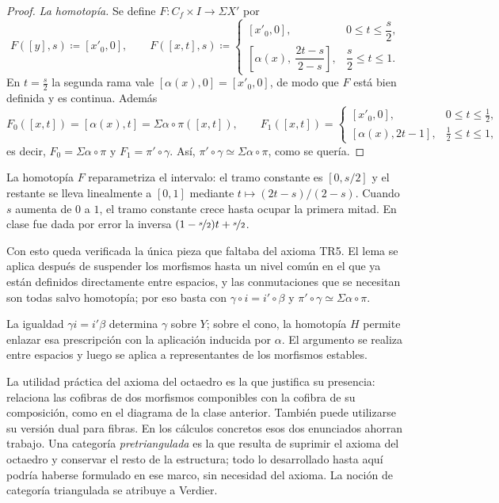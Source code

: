 \begin{proof}
\emph{La homotopía.} Se define $F\colon C_f\times I\to\Sigma X'$ por
\[
F([y],s)\coloneqq[x'_0,0],
\qquad
F([x,t],s)\coloneqq
\begin{cases}
[x'_0,0], & 0\le t\le\dfrac{s}{2},\\[6pt]
\left[\alpha(x),\ \dfrac{2t-s}{2-s}\right], & \dfrac{s}{2}\le t\le1 .
\end{cases}
\]
En $t=\tfrac s2$ la segunda rama vale $[\alpha(x),0]=[x'_0,0]$, de modo que $F$ está bien definida y es continua. Además
\[
F_0([x,t])=[\alpha(x),t]=\Sigma\alpha\circ\pi([x,t]),
\qquad
F_1([x,t])=
\begin{cases}
[x'_0,0], & 0\le t\le\tfrac12,\\[4pt]
[\alpha(x),2t-1], & \tfrac12\le t\le1,
\end{cases}
\]
es decir, $F_0=\Sigma\alpha\circ\pi$ y $F_1=\pi'\circ\gamma$. Así, $\pi'\circ\gamma\simeq\Sigma\alpha\circ\pi$, como se quería.
\end{proof}

\begin{nota}
   La homotopía $F$ reparametriza el intervalo: el tramo constante es $[0,s/2]$ y el restante se lleva linealmente a $[0,1]$ mediante $t\mapsto(2t-s)/(2-s)$. Cuando $s$ aumenta de $0$ a $1$, el tramo constante crece hasta ocupar la primera mitad. En clase fue dada por error la inversa $(1-\nicefrac{s}{2})t+\nicefrac{s}{2}$.
\end{nota}

Con esto queda verificada la única pieza que faltaba del axioma \textup{TR5}. El lema se aplica después de suspender los morfismos hasta un nivel común en el que ya están definidos directamente entre espacios, y las conmutaciones que se necesitan son todas salvo homotopía; por eso basta con $\gamma\circ i=i'\circ\beta$ y $\pi'\circ\gamma\simeq\Sigma\alpha\circ\pi$.

\begin{nota}
   La igualdad $\gamma i=i'\beta$ determina $\gamma$ sobre $Y$; sobre el cono, la homotopía $H$ permite enlazar esa prescripción con la aplicación inducida por $\alpha$. El argumento se realiza entre espacios y luego se aplica a representantes de los morfismos estables.
\end{nota}

\begin{nota}
   La utilidad práctica del axioma del octaedro es la que justifica su presencia: relaciona las cofibras de dos morfismos componibles con la cofibra de su composición, como en el diagrama de la clase anterior. También puede utilizarse su versión dual para fibras. En los cálculos concretos esos dos enunciados ahorran trabajo. Una categoría \emph{pretriangulada} es la que resulta de suprimir el axioma del octaedro y conservar el resto de la estructura; todo lo desarrollado hasta aquí podría haberse formulado en ese marco, sin necesidad del axioma. La noción de categoría triangulada se atribuye a Verdier.
\end{nota}

